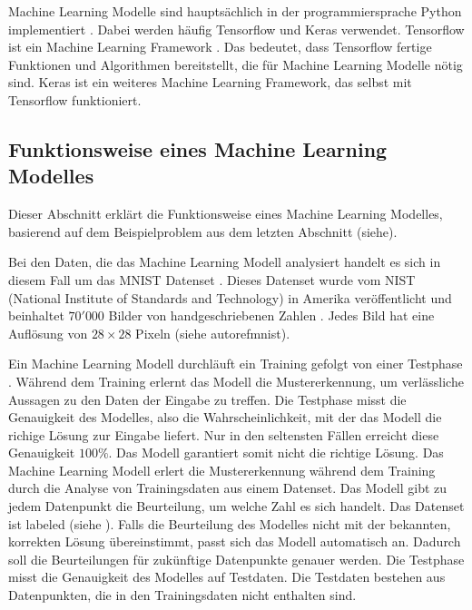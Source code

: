 Machine Learning Modelle sind hauptsächlich in der programmiersprache Python
implementiert \cite{sadie_bennett_why_2019}. Dabei werden häufig Tensorflow und Keras
verwendet. Tensorflow ist ein Machine Learning Framework
\cite{noauthor_tensorflow_nodate}. Das bedeutet, dass Tensorflow fertige
Funktionen und Algorithmen bereitstellt, die für Machine Learning Modelle nötig
sind. Keras ist ein weiteres Machine Learning Framework, das selbst mit
Tensorflow funktioniert.


\subsection{Funktionsweise eines Machine Learning Modelles}\label{sub:t_ml_func}
Dieser Abschnitt erklärt die Funktionsweise eines Machine Learning Modelles,
basierend auf dem Beispielproblem aus dem letzten Abschnitt (siehe). 

Bei den Daten, die das Machine Learning Modell analysiert handelt es sich in
diesem Fall um das MNIST Datenset \cite{noauthor_mnist_nodate}. Dieses Datenset
wurde vom NIST (National Institute of Standards and Technology) in Amerika
veröffentlicht und beinhaltet $70'000$ Bilder von handgeschriebenen Zahlen
\cite{noauthor_emnist_2017}. Jedes Bild hat eine Auflösung von $28\times28$
Pixeln (siehe autoref{mnist}). %

                
Ein Machine Learning Modell durchläuft ein Training gefolgt von einer Testphase
\cite{noauthor_training_nodate}. Während dem Training erlernt das Modell die
Mustererkennung, um verlässliche Aussagen zu den Daten der Eingabe zu treffen.
Die Testphase misst die Genauigkeit des Modelles, also die Wahrscheinlichkeit,
mit der das Modell die richige Lösung zur Eingabe liefert. Nur in den seltensten
Fällen erreicht diese Genauigkeit $100\%$. Das Modell garantiert somit nicht die
richtige Lösung. Das Machine Learning Modell erlert die Mustererkennung während
dem Training durch die Analyse von Trainingsdaten aus einem Datenset. Das Modell
gibt zu jedem Datenpunkt die Beurteilung, um welche Zahl es sich handelt. Das
Datenset ist labeled (siehe ). Falls die Beurteilung des
Modelles nicht mit der bekannten, korrekten Lösung übereinstimmt, passt sich das
Modell automatisch an. Dadurch soll die Beurteilungen für zukünftige Datenpunkte
genauer werden. Die Testphase misst die Genauigkeit des Modelles auf Testdaten.
Die Testdaten bestehen aus Datenpunkten, die in den Trainingsdaten nicht
enthalten sind.

